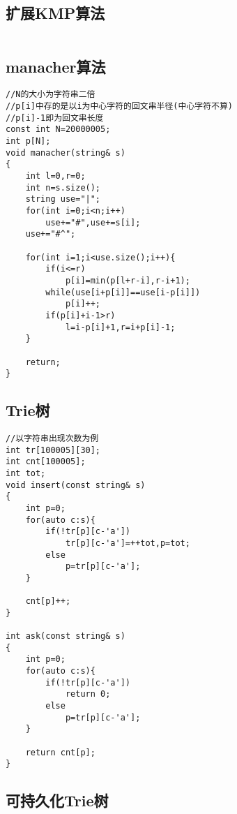 \documentclass[twocolumn,a4]{article}
\begin{document}
\subsection{扩展KMP算法}
\begin{lstlisting}

\end{lstlisting}

\subsection{manacher算法}
\begin{lstlisting}
//N的大小为字符串二倍
//p[i]中存的是以i为中心字符的回文串半径(中心字符不算)
//p[i]-1即为回文串长度
const int N=20000005;
int p[N];
void manacher(string& s)
{
    int l=0,r=0;
    int n=s.size();
    string use="|";
    for(int i=0;i<n;i++)
        use+="#",use+=s[i];
    use+="#^";
    
    for(int i=1;i<use.size();i++){
        if(i<=r)
            p[i]=min(p[l+r-i],r-i+1);
        while(use[i+p[i]]==use[i-p[i]])
            p[i]++;
        if(p[i]+i-1>r)
            l=i-p[i]+1,r=i+p[i]-1;
    }
    
    return;
}
\end{lstlisting}

\subsection{Trie树}
\begin{lstlisting}
//以字符串出现次数为例
int tr[100005][30];
int cnt[100005];
int tot;
void insert(const string& s)
{
    int p=0;
    for(auto c:s){
        if(!tr[p][c-'a'])
            tr[p][c-'a']=++tot,p=tot;
        else
            p=tr[p][c-'a'];
    }
    
    cnt[p]++;
}

int ask(const string& s)
{
    int p=0;
    for(auto c:s){
        if(!tr[p][c-'a'])
            return 0;
        else
            p=tr[p][c-'a'];
    }
    
    return cnt[p];
}
\end{lstlisting}

\subsection{可持久化Trie树}
\begin{lstlisting}

\end{lstlisting}
\end{document}
